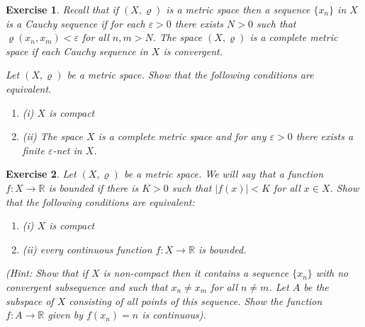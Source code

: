 \documentclass[11pt, letterpaper, oneside]{report}
\theoremstyle{pplain}
\newtheorem{ITERMVALUE THM}[theorem]{Intermediate Value Theorem}
\newtheorem{HEINEBOREL THM}[theorem]{Heine-Borel Theorem}
\newtheorem{UMETR THM}[theorem]{Urysohn Metrization Theorem}
\newtheorem{UMETR2 THM}[theorem]{Urysohn Metrization Theorem (v.2)}
\theoremstyle{ddefinition}
\theoremstyle{nnn}
\newtheorem{TDA NN}[theorem]{Topological Data Analysis. }
\theoremstyle{eexercise}
\newtheorem{exercise}{Exercise}[chapter]
\newcommand{\R}{{\mathbb R}}
\newcommand{\benu}{\begin{enumerate}}
\newcommand{\eenu}{\end{enumerate}}
\begin{document}
\begin{exercise}
Recall that if $(X, \varrho)$ is a metric space then a sequence $\{x_{n}\}$ in $X$ is a Cauchy sequence
if for each $\varepsilon > 0$ there exists $N > 0$ such that $\varrho(x_{n}, x_{m}) < \varepsilon$
for all $n, m > N$. The space $(X, \varrho)$ is a \emph{complete metric space} if each Cauchy sequence 
in $X$ is convergent.  

Let $(X, \varrho)$ be a metric space. Show that the following conditions are equivalent.
\benu
\item[(i)] $X$ is compact
\item[(ii)] The space $X$ is a complete metric space and for any $\varepsilon >0$ there exists 
a finite $\varepsilon$-net in $X$. 
\eenu
\end{exercise}




\begin{exercise}
Let $(X, \varrho)$ be a metric space. We will say that a function $f\colon X\to \R$ is \emph{bounded}
if there is $K > 0$ such that $|f(x)| < K$ for all $x\in X$. Show that the following conditions are equivalent:
\benu
\item[(i)] $X$ is compact 
\item[(ii)] every continuous function $f\colon X \to \R$ is bounded.
\eenu
(Hint: Show that if $X$ is non-compact then it contains a sequence $\{x_{n}\}$ 
with no convergent subsequence and such that $x_{n}\neq x_{m}$ for all $n\neq m$.  
Let $A$ be the subspace of $X$ consisting of all points of this sequence. Show the function 
$f\colon A\to \R$ given by $f(x_{n}) = n$ is continuous). 
\end{exercise}
\end{document}
